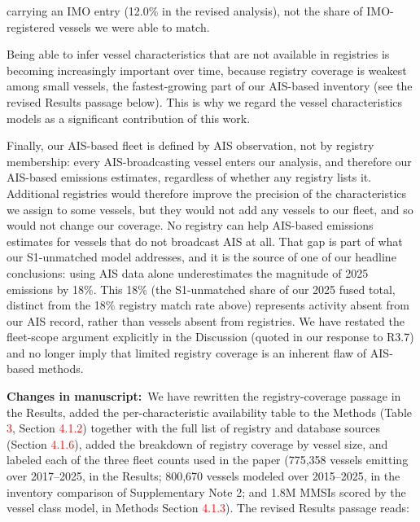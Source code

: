\documentclass[11pt]{article}
\newcommand{\changes}{\par\medskip\noindent%
  \textbf{\textcolor{changegreen}{Changes in manuscript:}}\ }
\begin{document}
carrying an IMO entry (12.0\% in the revised analysis), not the share of IMO-registered vessels we were able to match.

Being able to infer vessel characteristics that are not available in registries is becoming increasingly important over time, because registry coverage is weakest among small vessels, the fastest-growing part of our AIS-based inventory (see the revised Results passage below). This is why we regard the vessel characteristics models as a significant contribution of this work.

Finally, our AIS-based fleet is defined by AIS observation, not by registry membership: every AIS-broadcasting vessel enters our analysis, and therefore our AIS-based emissions estimates, regardless of whether any registry lists it. Additional registries would therefore improve the precision of the characteristics we assign to some vessels, but they would not add any vessels to our fleet, and so would not change our coverage. No registry can help AIS-based emissions estimates for vessels that do not broadcast AIS at all. That gap is part of what our S1-unmatched model addresses, and it is the source of one of our headline conclusions: using AIS data alone underestimates the magnitude of 2025 emissions by 18\%. This 18\% (the S1-unmatched share of our 2025 fused total, distinct from the 18\% registry match rate above) represents activity absent from our AIS record, rather than vessels absent from registries. We have restated the fleet-scope argument explicitly in the Discussion (quoted in our response to R3.7) and no longer imply that limited registry coverage is an inherent flaw of AIS-based methods.

\changes We have rewritten the registry-coverage passage in the Results, added the per-characteristic availability table to the Methods (Table \textcolor{red}{3}, Section \textcolor{red}{4.1.2}) together with the full list of registry and database sources (Section \textcolor{red}{4.1.6}), added the breakdown of registry coverage by vessel size, and labeled each of the three fleet counts used in the paper (775,358 vessels emitting over 2017--2025, in the Results; 800,670 vessels modeled over 2015--2025, in the inventory comparison of Supplementary Note 2; and 1.8M MMSIs scored by the vessel class model, in Methods Section \textcolor{red}{4.1.3}). The revised Results passage reads:
\end{document}
